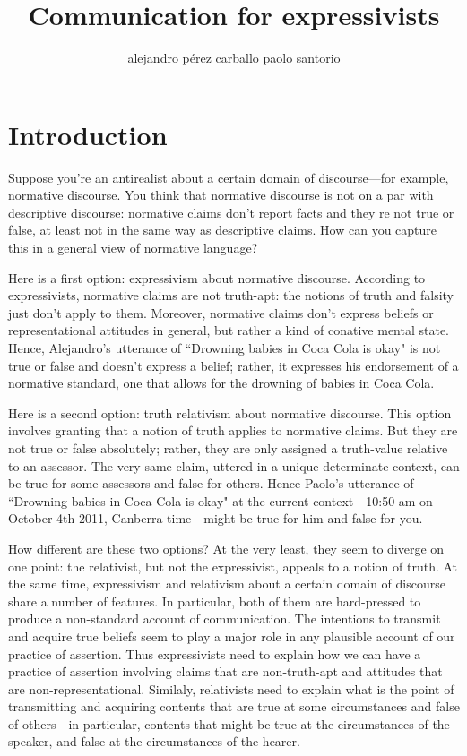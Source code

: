 \documentclass[11pt,article,oneside]{memoir}
\title{Communication for expressivists}
\author{\MakeLowercase{Alejandro P\'erez Carballo \amper Paolo Santorio}}
\begin{document}
\maketitle
	
\noindent

\section{Introduction}

Suppose you're an antirealist about a certain domain of discourse---for example, normative discourse. You think that normative discourse is not on a par with descriptive discourse: normative claims don't report facts and they re not true or false, at least not in the same way as descriptive claims. How can you capture this in a general view of normative language?

Here is a first option: expressivism about normative discourse. According to expressivists, normative claims are not truth-apt: the notions of truth and falsity just don't apply to them. Moreover, normative claims don't express beliefs or representational attitudes in general, but rather a kind of conative mental state. Hence, Alejandro's utterance of ``Drowning babies in Coca Cola is okay" is not true or false and doesn't express a belief; rather, it expresses his endorsement of a normative standard, one that allows for the drowning of babies in Coca Cola. 

Here is a second option: truth relativism about normative discourse. This option involves granting that a notion of truth applies to normative claims. But they are not true or false absolutely; rather, they are only assigned a truth-value relative to an assessor. The very same claim, uttered in a unique determinate context, can be true for some assessors and false for others. Hence Paolo's utterance of  ``Drowning babies in Coca Cola is okay" at the current context---10:50 am on October 4th 2011, Canberra time---might be true for him and false for you.

How different are these two options? At the very least, they seem to diverge on one point: the relativist, but not the expressivist, appeals to a notion of truth. At the same time, expressivism and relativism about a certain domain of discourse share a number of features. In particular, both of them are hard-pressed to produce a non-standard account of communication. The intentions to transmit and acquire true beliefs seem to play a major role in any plausible account of our practice of assertion. Thus expressivists need to explain how we can have a practice of assertion involving claims that are non-truth-apt and attitudes that are non-representational. Similaly, relativists need to explain what is the point of transmitting and acquiring contents that are true at some circumstances and false of others---in particular, contents that might be true at the circumstances of the speaker, and false at the circumstances of the hearer. 
\end{document}
